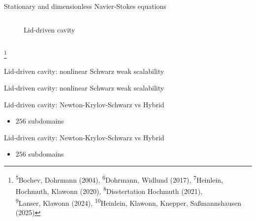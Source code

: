 \begin{frame}{Stationary and dimensionless Navier-Stokes equations}
\begin{columns}
\begin{column}{0.4\textwidth}
\begin{figure}
				\caption{Lid-driven cavity}
			\end{figure}
		\end{column}
	\end{columns}
    {\let\thefootnote\relax\footnote{{\tiny \textsuperscript{5}Bochev, Dohrmann (2004),  \textsuperscript{6}Dohrmann, Widlund (2017), \textsuperscript{7}Heinlein, Hochmuth, Klawonn (2020),  \textsuperscript{8}Disstertation Hochmuth (2021),\\\hspace{3em}\textsuperscript{9}Lanser, Klawonn (2024),  \textsuperscript{10}Heinlein, Klawonn, Knepper, Saßmannshausen (2025)}}}
\end{frame}

\begin{frame}{Lid-driven cavity: nonlinear Schwarz weak scalability}
	\begin{figure}
		\centering
		
		\label{fig:weak-scalability-nls}
	\end{figure}
\end{frame}

\begin{frame}{Lid-driven cavity: nonlinear Schwarz weak scalability}
	\begin{figure}
		\centering
		
		\label{fig:weak-scalability-per-iter-nls}
	\end{figure}
\end{frame}

\begin{frame}{Lid-driven cavity: Newton-Krylov-Schwarz vs Hybrid}
	\begin{itemize}
		\item $256$ subdomains
	\end{itemize}
	\begin{figure}
		\centering
		
		\label{fig:residual-ldc-256}
	\end{figure}
\end{frame}

\begin{frame}{Lid-driven cavity: Newton-Krylov-Schwarz vs Hybrid}
	\begin{itemize}
		\item $256$ subdomains
	\end{itemize}
	\begin{figure}
		\centering
		
		\label{fig:residual-ldc-4096}
	\end{figure}
\end{frame}


